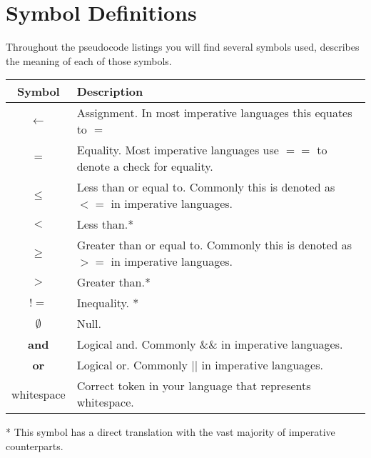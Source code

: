 \chapter{Symbol Definitions}
Throughout the pseudocode listings you will find several symbols used,  describes the meaning of each of those symbols.

\begin{tabular}[t]{|c|l|}
\hline
\textbf{Symbol} & \textbf{Description} \\
\hline
$\leftarrow$ & Assignment. In most imperative languages this equates to $=$ \\
\hline
$=$ & Equality. Most imperative languages use $==$ to denote a check for equality. \\
\hline
$\leq$ & Less than or equal to. Commonly this is denoted as $<=$ in imperative languages. \\
\hline
$<$ & Less than.* \\
\hline
$\geq$ & Greater than or equal to. Commonly this is denoted as $>=$ in imperative languages. \\
\hline
$>$ & Greater than.* \\
\hline
$!=$ & Inequality. * \\
\hline
$\emptyset$ & Null. \\
\hline
\textbf{and} & Logical and. Commonly \&\& in imperative languages. \\
\hline
\textbf{or} & Logical or. Commonly || in imperative languages. \\ 
\hline
whitespace & Correct token in your language that represents whitespace. \\
\hline
\end{tabular}

* This symbol has a direct translation with the vast majority of imperative counterparts.
